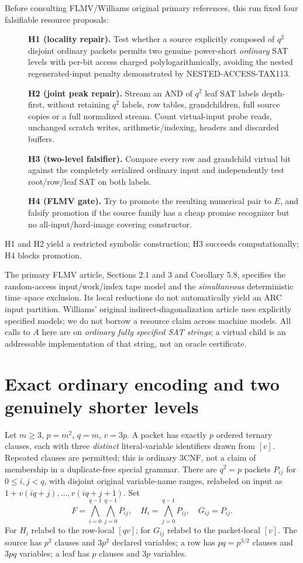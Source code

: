 \documentclass[11pt]{article}
\begin{document}
Before consulting FLMV/Williams original primary references, this
run fixed four falsifiable resource proposals:
\begin{description}
\item[] \textbf{H1 (locality repair).} Test whether a source explicitly
composed of \(q^2\) disjoint ordinary packets permits two genuine
power-short \emph{ordinary} SAT levels with per-bit access charged
polylogarithmically, avoiding the nested regenerated-input penalty
demonstrated by NESTED-ACCESS-TAX113.
\item[] \textbf{H2 (joint peak repair).} Stream an AND of \(q^2\)
leaf SAT labels depth-first, without retaining \(q^2\) labels, row tables,
grandchildren, full source copies or a full normalized stream.
Count virtual-input probe reads, unchanged scratch writes,
arithmetic/indexing, headers and discarded buffers.
\item[] \textbf{H3 (two-level falsifier).} Compare every row and
grandchild virtual bit against the completely serialized ordinary
input and independently test root/row/leaf SAT on both labels.
\item[] \textbf{H4 (FLMV gate).} Try to promote the resulting numerical
pair to \(E\), and falsify promotion if the source family has a cheap
promise recognizer but no all-input/hard-image covering constructor.
\end{description}
H1 and H2 yield a restricted symbolic construction; H3 succeeds
computationally; H4 blocks promotion.

The primary FLMV article, Sections 2.1 and 3 and Corollary 5.8,
specifies the random-access input/work/index tape model and the
\emph{simultaneous} deterministic time--space exclusion.
Its local reductions do not automatically yield an ARC input
partition. Williams' original indirect-diagonalization article uses
explicitly specified models; we do not borrow a resource claim
across machine models. All calls to \(A\) here are on \emph{ordinary
fully specified SAT strings}; a virtual child is an addressable
implementation of that string, not an oracle certificate.

\section{Exact ordinary encoding and two genuinely shorter levels}
Let \(m\ge3\), \(p=m^2\), \(q=m\), \(v=3p\). A packet has
exactly \(p\) ordered ternary clauses, each with three \emph{distinct}
literal-variable identifiers drawn from \([v]\). Repeated clauses
are permitted; this is ordinary 3CNF, not a claim of membership in a
duplicate-free special grammar. There are \(q^2=p\) packets
\(P_{ij}\) for \(0\le i,j<q\), with disjoint original
variable-name ranges, relabeled on input as
\(1+v(iq+j),\ldots,v(iq+j+1)\). Set
\[
 F=\bigwedge_{i=0}^{q-1}\bigwedge_{j=0}^{q-1}P_{ij},
 \quad H_i=\bigwedge_{j=0}^{q-1}P_{ij},
 \quad G_{ij}=P_{ij}.
\tag{1}
\]
For \(H_i\) relabel to the row-local \([qv]\);
for \(G_{ij}\) relabel to the packet-local \([v]\).
The source has \(p^2\) clauses and \(3p^2\) declared variables;
a row has \(pq=p^{3/2}\) clauses and \(3pq\) variables;
a leaf has \(p\) clauses and \(3p\) variables.
\end{document}
